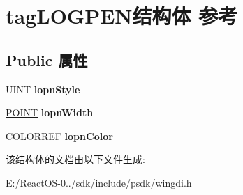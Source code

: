 \hypertarget{structtag_l_o_g_p_e_n}{}\section{tag\+L\+O\+G\+P\+E\+N结构体 参考}
\label{structtag_l_o_g_p_e_n}
\subsection*{Public 属性}
\begin{DoxyCompactItemize}
\item 
\mbox{\label{structtag_l_o_g_p_e_n_adcbe10ae760570ed99ee6967e8dcc66c}} 
U\+I\+NT {\bfseries lopn\+Style}
\item 
\mbox{\label{structtag_l_o_g_p_e_n_a1a7c404459790f1f1b98e6904e9b4b73}} 
\hyperlink{structtag_p_o_i_n_t}{P\+O\+I\+NT} {\bfseries lopn\+Width}
\item 
\mbox{\label{structtag_l_o_g_p_e_n_a123d71192afdb4b1ca3acf44469aabb7}} 
C\+O\+L\+O\+R\+R\+EF {\bfseries lopn\+Color}
\end{DoxyCompactItemize}


该结构体的文档由以下文件生成\+:\begin{DoxyCompactItemize}
\item 
E\+:/\+React\+O\+S-\/0../sdk/include/psdk/wingdi.\+h\end{DoxyCompactItemize}
